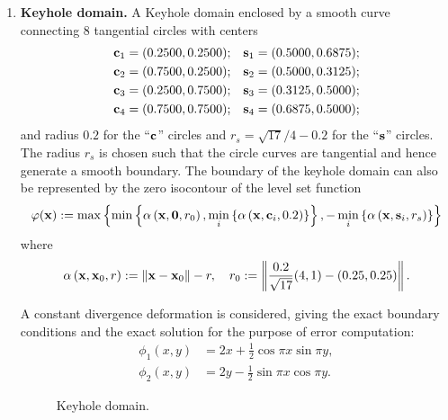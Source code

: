 \begin{enumerate}

\item \textbf{Keyhole domain.} A Keyhole domain enclosed by a smooth curve connecting $8$ tangential circles with centers
\begin{align*}
\mathbf{c}_1 & = (0.2500, 0.2500); & \mathbf{s}_1 & = (0.5000, 0.6875); \\
\mathbf{c}_2 & = (0.7500, 0.2500); & \mathbf{s}_2 & = (0.5000, 0.3125); \\
\mathbf{c}_3 & = (0.2500, 0.7500); & \mathbf{s}_3 & = (0.3125, 0.5000); \\
\mathbf{c}_4 & = (0.7500, 0.7500); & \mathbf{s}_4 & = (0.6875, 0.5000); \\
\end{align*}
and radius $0.2$ for the ``$\mathbf{c}$'' circles and $r_s = \sqrt{17}/4 - 0.2$ for the ``$\mathbf{s}$'' circles. The radius $r_s$ is chosen such that the circle curves are tangential and hence generate a smooth boundary. The boundary of the keyhole domain can also be represented by the zero isocontour of the level set function
\begin{equation*}
\varphi(\mathbf{x}) := \max \left\lbrace  \min \left\lbrace  \alpha \left( \mathbf{x}, \mathbf{0}, r_0 \right), \min_i \left\lbrace  \alpha \left( \mathbf{x}, \mathbf{c}_i, 0.2 \right)  \right\rbrace \right\rbrace, -\min_i \left\lbrace  \alpha \left( \mathbf{x}, \mathbf{s}_i, r_s \right)  \right\rbrace  \right\rbrace
\end{equation*}
where
\begin{equation*}
\alpha \left( \mathbf{x}, \mathbf{x}_0, r \right) := \left\lVert \mathbf{x} - \mathbf{x}_0 \right\rVert - r, \quad
r_0 := \left\lVert \frac{0.2}{\sqrt{17}} (4, 1) - (0.25, 0.25) \right\rVert.
\end{equation*}

A constant divergence deformation is considered, giving the exact boundary conditions and the exact solution for the purpose of error computation:
\begin{align*}
\phi_1(x,y) & = 2x + \frac{1}{2} \cos \pi x \sin \pi y, \\
\phi_2(x,y) & = 2y - \frac{1}{2} \sin \pi x \cos \pi y.
\end{align*}

\setlength{\figurewidth}{0.50\textwidth}
\begin{figure}[htbp]
\centering
{}
\caption{Keyhole domain.}
\end{figure}


\end{enumerate}
